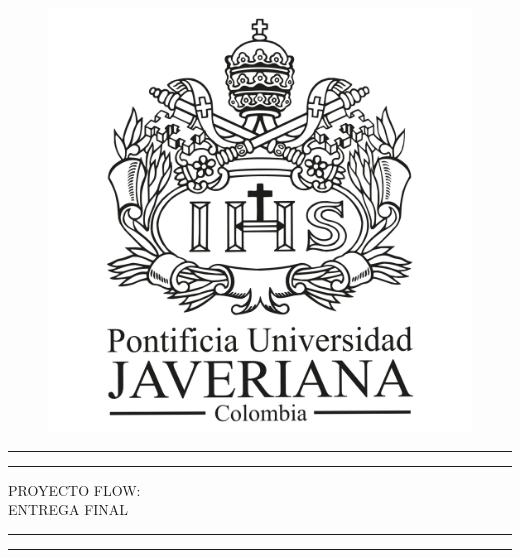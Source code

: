 \documentclass[letter,12pt]{article}
\begin{document}
\begin{titlepage} %
	
	\centering %
	
	\scshape %
	
	\vspace*{\baselineskip} %
	
	\begin{figure}[ht!]
    	\centering
    	\includegraphics[width=0.4\linewidth]{img/PUJ.png}
    \end{figure}
    
    \vspace*{1.5\baselineskip} 
	
	
	\rule{\textwidth}{1.6pt}\vspace*{-\baselineskip}\vspace*{2pt} %
	\rule{\textwidth}{0.4pt} %
	
	\vspace{0.75\baselineskip} %
	
	{\LARGE PROYECTO FLOW: \\ ENTREGA FINAL \\} %
	
	\vspace{0.75\baselineskip} %
	
	\rule{\textwidth}{0.4pt}\vspace*{-\baselineskip}\vspace{3.2pt} %
	\rule{\textwidth}{1.6pt} %
	
	\vspace{2\baselineskip} %
	

\end{titlepage}
\end{document}
